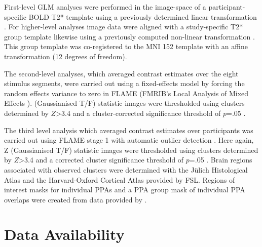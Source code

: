 \documentclass[english,11pt]{article}
\begin{document}
First-level GLM analyses were performed in the image-space of a
participant-specific BOLD T2* template using a previously determined linear
transformation \citep{sengupta2016extension}.
For higher-level analyses image data were aligned with a study-specific T2*
group template likewise using a previously computed non-linear transformation
\citep{hanke2014audiomovie}.
This group template was co-registered to the MNI 152 template with an affine
transformation (12 degrees of freedom).

The second-level analyses, which averaged contrast estimates over the eight
stimulus segments, were carried out using a fixed-effects model by forcing the
random effects variance to zero in FLAME (FMRIB's Local Analysis of Mixed
Effects \citep{beckmann2003general, woolrich2004multilevel}).
(Gaussianised T/F) statistic images were thresholded using clusters determined
by $Z$>3.4 and a cluster-corrected significance threshold of $p$=.05
\citep{worsley2001statistical}.

The third level analysis which averaged contrast estimates over participants was
carried out using FLAME stage 1 with automatic outlier detection
\citep{beckmann2003general, woolrich2004multilevel, woolrich2008robust}.
Here again, Z (Gaussianised T/F) statistic images were thresholded using
clusters determined by $Z$>3.4 and a corrected cluster significance threshold of
$p$=.05 \citep{worsley2001statistical}.
Brain regions associated with observed clusters were determined with the Jülich
Histological Atlas \citep{eickhoff2005toolbox, eickhoff2007assignment} and the
Harvard-Oxford Cortical Atlas \citep{desikan2006automated} provided by FSL.
Regions of interest masks for individual PPAs and a PPA group mask of
individual PPA overlaps were created from data provided by
\citet{sengupta2016extension}.



\section*{Data Availability}
\end{document}
